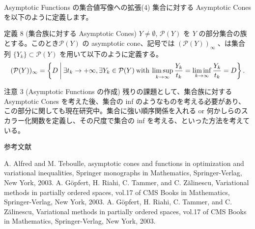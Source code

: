 \documentclass[aspectratio=169, dvipdfmx, 11pt]{beamer} %
\begin{document}
\begin{frame}{Asymptotic Functions の集合値写像への拡張(4)}
  集合に対する Asymptotic Cones を以下のように定義します。

  \begin{block}{定義 8 (集合族に対する Asymptotic Cones)}
    $Y \ne \emptyset$, $\mathcal{P}(Y)$ を $Y$ の部分集合の族とする。このとき$\mathcal{P}(Y)$ の asymptotic cone、記号では $(\mathcal{P}(Y))_\infty$ 、は集合列 $\{ Y_k \} \subset \mathcal{P}(Y)$ を用いて以下のように定義する。
    \begin{equation}
      (\mathcal{P}(Y))_\infty = \left\{ D \:\middle|\: \exists t_k \rightarrow +\infty, \exists Y_k \in \mathcal{P}(Y) \:\text{with}\: \limsup_{k \to \infty} \frac{Y_k}{t_k} = \liminf_{k \to \infty} \frac{Y_k}{t_k} = D \right\}. \notag
    \end{equation}
  \end{block}

  \begin{alertblock}{注意 3 (Asymptotic Functions の作成)}
    残りの課題として、集合族に対する Asymptotic Cones を考えた後、集合の inf のようなものを考える必要があり、この部分に関しても現在研究中。集合に強い順序関係を入れる or 何かしらのスカラー化関数を定義し、その尺度で集合の inf を考える、といった方法を考えている。
  \end{alertblock}
\end{frame}

\begin{frame}[t]{参考文献}
  \begin{itemize}
    A. Alfred and M. Teboulle, asymptotic cones and functions in optimization and variational inequalities, Springer monographs in Mathematics, Springer-Verlag, New York, 2003.
    A. G\"{o}pfert, H. Riahi, C. Tammer, and C. Z\u{a}linescu, Variational methods in partially ordered spaces, vol.17 of CMS Books in Mathematics, Springer-Verlag, New York, 2003.
    A. G\"{o}pfert, H. Riahi, C. Tammer, and C. Z\u{a}linescu, Variational methods in partially ordered spaces, vol.17 of CMS Books in Mathematics, Springer-Verlag, New York, 2003.
  \end{itemize}
\end{frame}
\end{document}
